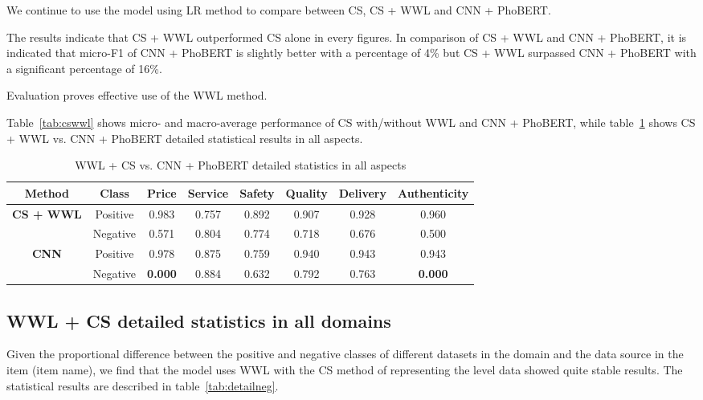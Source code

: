 We continue to use the model using LR method to compare between CS, CS + WWL and CNN + PhoBERT. 

The results indicate that CS + WWL outperformed CS alone in every figures. In comparison of CS + WWL and CNN + PhoBERT, it is indicated that micro-F1 of CNN + PhoBERT is slightly better with a percentage of 4\% but CS + WWL surpassed CNN + PhoBERT with a significant percentage of 16\%.

Evaluation proves effective use of the WWL method.

Table~\ref{tab:cswwl} shows micro- and macro-average performance of CS with/without WWL and CNN + PhoBERT, while table~\ref{tab:allaspects} shows CS + WWL vs. CNN + PhoBERT detailed statistical results in all aspects.

\begin{table}[h]
\centering
\begin{tabular}{|c|c|c|c|c|c|c|c|}
\hline
\textbf{Method} & \textbf{Class} & \textbf{Price} & \textbf{Service} & \textbf{Safety} & \textbf{Quality} & \textbf{Delivery} & \textbf{Authenticity} \\ \hline
\multirow{2}{*}{\textbf{CS + WWL}} & Positive & 0.983          & 0.757 & 0.892 & 0.907 & 0.928 & 0.960          \\ \cline{2-8} 
                                   & Negative & 0.571          & 0.804 & 0.774 & 0.718 & 0.676 & 0.500          \\ \hline
\multirow{2}{*}{\textbf{CNN}}      & Positive & 0.978          & 0.875 & 0.759 & 0.940 & 0.943 & 0.943          \\ \cline{2-8} 
                                   & Negative & \textbf{0.000} & 0.884 & 0.632 & 0.792 & 0.763 & \textbf{0.000} \\ \hline
\end{tabular}
\caption{WWL + CS vs. CNN + PhoBERT detailed statistics in all aspects}
\label{tab:allaspects}
\end{table}

\subsection{WWL + CS detailed statistics in all domains}
Given the proportional difference between the positive and negative classes of different datasets in the domain and the data source in the item (item name), we find that the model uses WWL with the CS method of representing the level data showed quite stable results.
The statistical results are described in table~\ref{tab:detailneg}.


